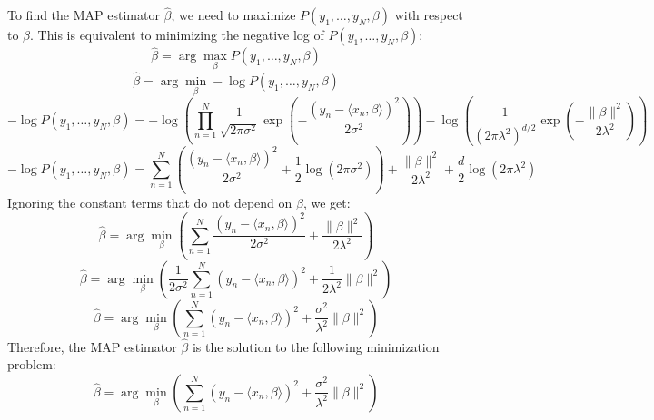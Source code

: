 \documentclass[a3paper,12pt]{extarticle} %
\begin{document}
\begin{enumerate}
\begin{enumerate}
\begin{enumerate}
            To find the MAP estimator \( \hat{\beta} \), we need to maximize \( P(y_1, \ldots, y_N, \beta) \) with respect to \( \beta \). This is equivalent to minimizing the negative log of \( P(y_1, \ldots, y_N, \beta) \):
            \[
                \hat{\beta} = \arg \max_{\beta} P(y_1, \ldots, y_N, \beta)
            \]
            \[
                \hat{\beta} = \arg \min_{\beta} -\log P(y_1, \ldots, y_N, \beta)
            \]
            \[
                -\log P(y_1, \ldots, y_N, \beta) = -\log \left( \prod_{n=1}^N \frac{1}{\sqrt{2 \pi \sigma^2}} \exp \left( -\frac{(y_n - \langle x_n, \beta \rangle)^2}{2 \sigma^2} \right) \right) - \log \left( \frac{1}{(2 \pi \lambda^2)^{d/2}} \exp \left( -\frac{\|\beta\|^2}{2 \lambda^2} \right) \right)
            \]
            \[
                -\log P(y_1, \ldots, y_N, \beta) = \sum_{n=1}^N \left( \frac{(y_n - \langle x_n, \beta \rangle)^2}{2 \sigma^2} + \frac{1}{2} \log (2 \pi \sigma^2) \right) + \frac{\|\beta\|^2}{2 \lambda^2} + \frac{d}{2} \log (2 \pi \lambda^2)
            \]
            Ignoring the constant terms that do not depend on \( \beta \), we get:
            \[
                \hat{\beta} = \arg \min_{\beta} \left( \sum_{n=1}^N \frac{(y_n - \langle x_n, \beta \rangle)^2}{2 \sigma^2} + \frac{\|\beta\|^2}{2 \lambda^2} \right)
            \]
            \[
                \hat{\beta} = \arg \min_{\beta} \left( \frac{1}{2 \sigma^2} \sum_{n=1}^N (y_n - \langle x_n, \beta \rangle)^2 + \frac{1}{2 \lambda^2} \|\beta\|^2 \right)
            \]
            \[
                \hat{\beta} = \arg \min_{\beta} \left( \sum_{n=1}^N (y_n - \langle x_n, \beta \rangle)^2 + \frac{\sigma^2}{\lambda^2} \|\beta\|^2 \right)
            \]
            Therefore, the MAP estimator \( \hat{\beta} \) is the solution to the following minimization problem:
            \[
                \hat{\beta} = \arg \min_{\beta} \left( \sum_{n=1}^N (y_n - \langle x_n, \beta \rangle)^2 + \frac{\sigma^2}{\lambda^2} \|\beta\|^2 \right)
            \]
        \end{enumerate}
        
    \end{enumerate}
\end{enumerate}

\newpage
\end{document}

